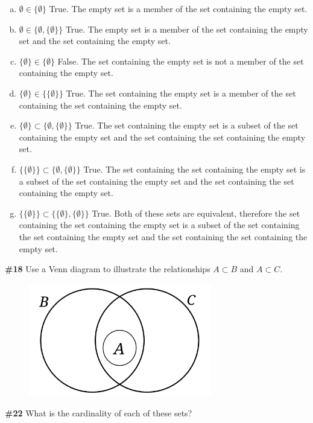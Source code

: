 \documentclass{article}
\newcommand{\problem}[1]{\textbf{\##1}}
\newcommand{\prob}[1]{\problem{#1}}
\begin{document}
\begin{enumerate}[a)]
    \item \(\emptyset \in \{\emptyset\}\)
    True. The empty set is a member of the set containing the empty set.
    \item \(\emptyset \in \{\emptyset, \{\emptyset\}\}\)
    True. The empty set is a member of the set containing the empty set and the set containing the empty set.
    \item \(\{\emptyset\} \in \{\emptyset\}\)
    False. The set containing the empty set is not a member of the set containing the empty set.
    \item \(\{\emptyset\} \in \{\{\emptyset\}\}\) True. The set containing the empty set is a member of the set containing the set containing the empty set.
    \item \(\{\emptyset\} \subset \{\emptyset, \{\emptyset\}\}\) True. The set containing the empty set is a subset of the set containing the empty set and the set containing the set containing the empty set.
    \item \(\{\{\emptyset\}\} \subset \{\emptyset, \{\emptyset\}\}\) True. The set containing the set containing the empty set is a subset of the set containing the empty set and the set containing the set containing the empty set.
    \item \(\{\{\emptyset\}\} \subset \{\{\emptyset\}, \{\emptyset\}\}\) True. Both of these sets are equivalent, therefore the set containing the set containing the empty set is a subset of the set containing the set containing the empty set and the set containing the set containing the empty set.
\end{enumerate}
\pagebreak
\prob{18}
Use a Venn diagram to illustrate the relationships \(A \subset B\) and \(A \subset C\).
\graphicspath{{./images/}}
\begin{figure}[H]
    \includegraphics[width=8cm]{venn}
    \centering
\end{figure}
\pagebreak
\prob{22}
What is the cardinality of each of these sets?
\end{document}
